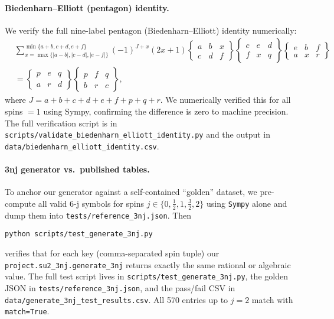 \documentclass[11pt]{article}
\begin{document}
\paragraph{Biedenharn--Elliott (pentagon) identity.}
We verify the full nine-label pentagon (Biedenharn--Elliott) identity numerically:
\begin{align*}
  &\sum_{x=\max\{|a-b|,|c-d|,|e-f|\}}^{\min\{a+b,c+d,e+f\}}
    (-1)^{J+x}(2x+1)
    \begin{Bmatrix}a & b & x\\ c & d & f\end{Bmatrix}
    \begin{Bmatrix}c & e & d\\ f & x & q\end{Bmatrix}
    \begin{Bmatrix}e & b & f\\ a & x & r\end{Bmatrix}
  \\&=
    \begin{Bmatrix}p & e & q\\ a & r & d\end{Bmatrix}
    \begin{Bmatrix}p & f & q\\ b & r & c\end{Bmatrix},
\end{align*}
where \(J=a+b+c+d+e+f+p+q+r\).
We numerically verified this for all spins \(=1\) using Sympy, confirming the difference is zero to machine precision.
The full verification script is in \texttt{scripts/validate\_biedenharn\_elliott\_identity.py} and the output in \texttt{data/biedenharn\_elliott\_identity.csv}.

\paragraph{3nj generator vs.\ published tables.}
To anchor our generator against a self-contained “golden” dataset, we pre-compute all valid 6-j symbols for spins $j\in\{0,\tfrac12,1,\tfrac32,2\}$ using \texttt{Sympy} alone and dump them into \texttt{tests/reference\_3nj.json}.  Then
\begin{verbatim}
python scripts/test_generate_3nj.py
\end{verbatim}
verifies that for each key (comma-separated spin tuple) our \texttt{project.su2\_3nj.generate\_3nj} returns exactly the same rational or algebraic value.  The full test script lives in
\texttt{scripts/test\_generate\_3nj.py}, the golden JSON in \texttt{tests/reference\_3nj.json}, and the pass/fail CSV in \texttt{data/generate\_3nj\_test\_results.csv}.  All 570 entries up to $j=2$ match with \texttt{match=True}.
\end{document}
